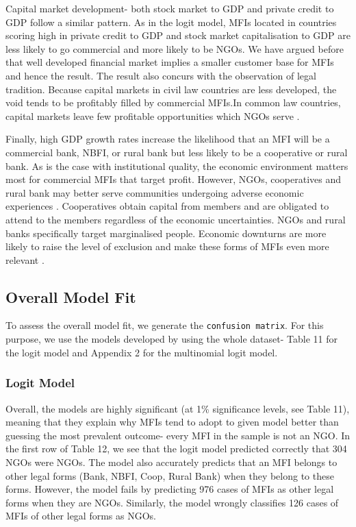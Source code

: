 \documentclass[a4paper, nobind]{templates/ociamthesis}
\begin{document}
Capital market development- both stock market to GDP and private credit to GDP follow a similar pattern. As in the logit model, MFIs located in countries scoring high in private credit to GDP and stock market capitalisation to GDP are less likely to go commercial and more likely to be NGOs. We have argued before that well developed financial market implies a smaller customer base for MFIs and hence the result. The result also concurs with the observation of legal tradition. Because capital markets in civil law countries are less developed, the void tends to be profitably filled by commercial MFIs.In common law countries, capital markets leave few profitable opportunities which NGOs serve \autocite{d2013unsubsidized,armendariz2013subsidy}.

Finally, high GDP growth rates increase the likelihood that an MFI will be a commercial bank, NBFI, or rural bank but less likely to be a cooperative or rural bank. As is the case with institutional quality, the economic environment matters most for commercial MFIs that target profit. However, NGOs, cooperatives and rural bank may better serve communities undergoing adverse economic experiences \autocite{ghosh2013microfinance}. Cooperatives obtain capital from members and are obligated to attend to the members regardless of the economic uncertainties. NGOs and rural banks specifically target marginalised people. Economic downturns are more likely to raise the level of exclusion and make these forms of MFIs even more relevant \autocite{schnyder2018twenty}.

\newpage

\hypertarget{overall-model-fit}{%
\subsection{Overall Model Fit}\label{overall-model-fit}}

To assess the overall model fit, we generate the \texttt{confusion\ matrix}. For this purpose, we use the models developed by using the whole dataset- Table 11 for the logit model and Appendix 2 for the multinomial logit model.

\hypertarget{logit-model}{%
\subsubsection{Logit Model}\label{logit-model}}

Overall, the models are highly significant (at 1\% significance levels, see Table 11), meaning that they explain why MFIs tend to adopt to given model better than guessing the most prevalent outcome- every MFI in the sample is not an NGO. In the first row of Table 12, we see that the logit model predicted correctly that 304 NGOs were NGOs. The model also accurately predicts that an MFI belongs to other legal forms (Bank, NBFI, Coop, Rural Bank) when they belong to these forms. However, the model fails by predicting 976 cases of MFIs as other legal forms when they are NGOs. Similarly, the model wrongly classifies 126 cases of MFIs of other legal forms as NGOs.
\end{document}
